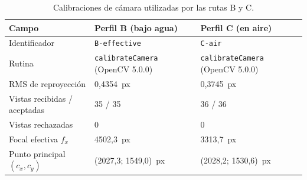 
\begin{table}[htbp]
\centering\footnotesize
\caption{Calibraciones de cámara utilizadas por las rutas B y C.}
\label{tab:calibraciones}
\begin{tabular}{@{}p{4.2cm}p{4.4cm}p{4.4cm}@{}}
\toprule
Campo & Perfil B (bajo agua) & Perfil C (en aire) \\
\midrule
Identificador & \texttt{B-effective} & \texttt{C-air} \\
Rutina & \texttt{calibrateCamera} (OpenCV 5.0.0) & \texttt{calibrateCamera} (OpenCV 5.0.0) \\
RMS de reproyección & 0,4354~px & 0,3745~px \\
Vistas recibidas / aceptadas & 35 / 35 & 36 / 36 \\
Vistas rechazadas & 0 & 0 \\
Focal efectiva $f_x$ & 4502,3~px & 3313,7~px \\
Punto principal $(c_x, c_y)$ & (2027,3; 1549,0)~px & (2028,2; 1530,6)~px \\
\bottomrule
\end{tabular}
\end{table}
